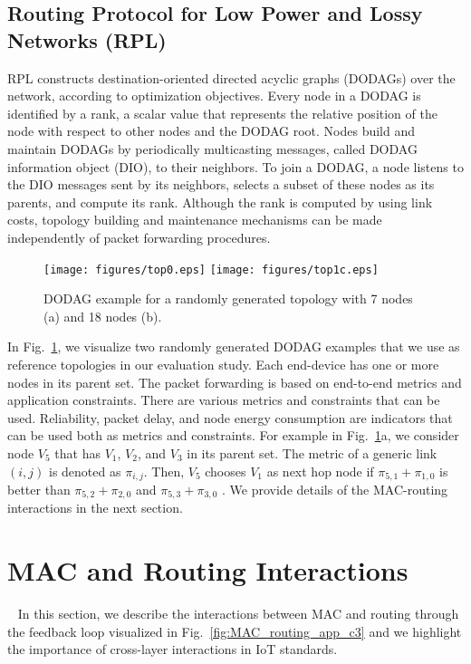 \documentclass[review, 1p, 11pt]{elsarticle}
\numberwithin{equation}{section}
\begin{document}
\subsection{Routing Protocol for Low Power and Lossy Networks (RPL)}\label{sec:routing-protocols}
RPL constructs destination-oriented directed acyclic graphs
(DODAGs) over the network, according to optimization objectives.
Every node in a DODAG is identified by a rank, a scalar value
that represents the relative position of the node with respect to
other nodes and the DODAG root.
Nodes build and maintain DODAGs by periodically multicasting
messages, called DODAG information object (DIO), to their
neighbors. To join a
DODAG, a node listens to the DIO messages sent by its neighbors,
selects a subset of these nodes as its parents, and compute its rank.
Although the rank is computed by using link costs, topology building and
maintenance mechanisms can be made independently of packet
forwarding procedures.



\begin{figure}\centering
  \texttt{[image: figures/top0.eps]}
  \texttt{[image: figures/top1c.eps]}
  \caption{DODAG example for a randomly generated topology with 7 nodes (a) and 18 nodes (b).}
  \label{fig:topology}
\end{figure}

In Fig.~\ref{fig:topology}, we visualize two randomly generated DODAG examples that we use as reference topologies in our evaluation study.
Each end-device has one or more nodes in its parent set.
The packet forwarding is based on end-to-end metrics and application
constraints. There are various metrics and constraints that can be
used. Reliability, packet delay, and node energy consumption are
indicators that can be used both as metrics and constraints.
For example in Fig.~\ref{fig:topology}a, we consider node $V_5$ that has $V_1$, $V_2$, and $V_3$ in its parent set.
The metric of a generic link $(i,j)$ is denoted as  $\pi_{i,j}$. Then, $V_5$ chooses $V_1$ as next hop
node if $\pi_{5,1}+\pi_{1,0}$ is better than $\pi_{5,2}+\pi_{2,0}$ and $\pi_{5,3}+\pi_{3,0}$ .
We provide details of the MAC-routing interactions in the next section.


\section{MAC and Routing Interactions}~\label{sec:complex-relation}
In this section, we describe the interactions between MAC and routing through the
feedback loop visualized in Fig.~\ref{fig:MAC_routing_app_c3} and we highlight the importance of cross-layer interactions
in IoT standards.
\end{document}
